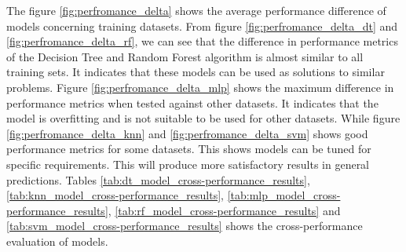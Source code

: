 The figure \ref{fig:perfromance_delta} shows the average performance difference of models concerning training datasets. From figure \ref{fig:perfromance_delta_dt} and \ref{fig:perfromance_delta_rf}, we can see that the difference in performance metrics of the Decision Tree and Random Forest algorithm is almost similar to all training sets. It indicates that these models can be used as solutions to similar problems. Figure \ref{fig:perfromance_delta_mlp} shows the maximum difference in performance metrics when tested against other datasets. It indicates that the model is overfitting and is not suitable to be used for other datasets. While figure \ref{fig:perfromance_delta_knn} and \ref{fig:perfromance_delta_svm} shows good performance metrics for some datasets. This shows models can be tuned for specific requirements. This will produce more satisfactory results in general predictions. Tables \ref{tab:dt_model_cross-performance_results}, \ref{tab:knn_model_cross-performance_results}, \ref{tab:mlp_model_cross-performance_results}, \ref{tab:rf_model_cross-performance_results} and \ref{tab:svm_model_cross-performance_results} shows the cross-performance evaluation of models.

